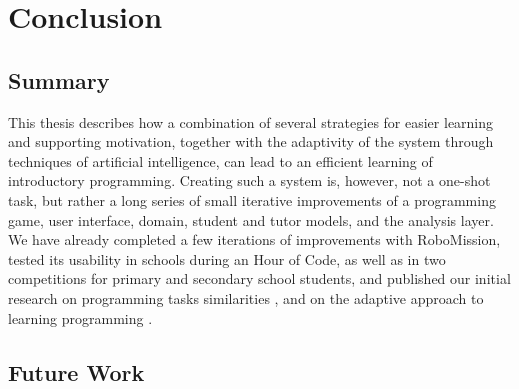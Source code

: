 \chapter{Conclusion}
\label{chap:conclusion}


\section{Summary}

This thesis describes how a combination of several strategies for easier learning and
supporting motivation, together with the adaptivity of the system
through techniques of artificial intelligence,
can lead to an efficient learning of introductory programming. %
Creating such a system is, however, not a one-shot task, but rather a long series
of small iterative improvements of a programming game, user interface,
domain, student and tutor models, and the analysis layer.
We have already completed a few iterations of improvements with
RoboMission,
tested its usability in schools during an Hour of Code,
as well as in two competitions for primary and secondary school students,
and published our initial research on programming tasks similarities \cite{alg.similarity},
and on the adaptive approach to learning programming \cite{robomission}.



\section{Future Work}

